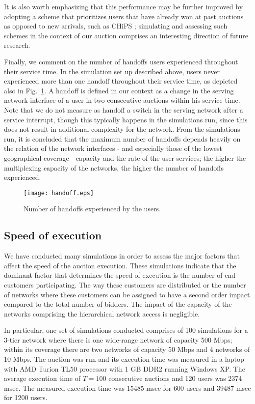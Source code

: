\documentclass[a4paper]{article}
\begin{document}
It is also worth emphasizing that this performance may be further
improved by adopting a scheme that prioritizes users that have already won 
at past auctions as opposed to new arrivals, such as CHiPS \cite{chips};
simulating and assessing such schemes in the context of our auction comprises
an interesting direction of future research.

Finally, we comment on the number of handoffs users experienced throughout
their service time. In the simulation set up described above, users never
experienced more than one handoff throughout their service time, as 
depicted also in Fig.~\ref{fig:handoff}. A handoff
is defined in our context as a change in the serving network interface of
a user in two consecutive auctions within his service time. Note that we
do not measure as handoff a switch in the serving network after a service
interrupt, though this typically happens in the simulations run, 
since this does not result in additional complexity for the
network. From the simulations run, it is concluded that the maximum number
of handoffs depends heavily on the relation of the network interfaces - and 
especially those of the lowest geographical coverage - capacity
and the rate of the user services; the higher the multiplexing capacity
of the networks, the higher the number of handoffs experienced.

\begin{figure}[htbp]
	\centering\texttt{[image: handoff.eps]}
	\caption{Number of handoffs experienced by the users.}
	\label{fig:handoff}
\end{figure}

\subsection{Speed of execution}

We have conducted many simulations in order to assess the major factors 
that affect the speed of the auction execution. These simulations indicate
that the dominant factor that determines the speed of execution is the number
of end customers participating. The way these customers are distributed or the
number of networks where these customers can be assigned to have a second order
impact compared to the total number of bidders. The impact of the capacity of
the networks comprising the hierarchical network access is negligible.

In particular, one set of simulations conducted comprises of 100 simulations 
for a 3-tier network where
there is one wide-range network of capacity 500 Mbps; within its coverage
there are two networks of capacity 50 Mbps and 4 networks of 10 Mbps.
The auction was run and its execution time was measured in a laptop with 
AMD Turion TL50 processor with 1 GB DDR2 running Windows XP. The average
execution time of $T=100$ consecutive auctions and 120 users was 2374 msec. 
The measured execution time was 15485 msec for 600 users and 39487 msec 
for 1200 users. 
\end{document}
